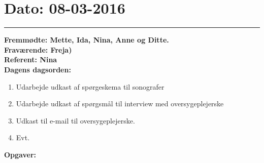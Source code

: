 \section{Dato: 08-03-2016}
\hrule
\textbf{Fremmødte: Mette, Ida, Nina, Anne og Ditte.} \\
\textbf{Fraværende: Freja)} \\
\textbf{Referent: Nina } \\
\textbf{Dagens dagsorden: }
\begin{enumerate}
	\item Udarbejde udkast af spørgeskema til sonografer
	\item Udarbejde udkast af spørgsmål til interview med oversygeplejerske
	\item Udkast til e-mail til oversygeplejerske.
	\item Evt. 
\end{enumerate}

\textbf{Opgaver:} \newline

